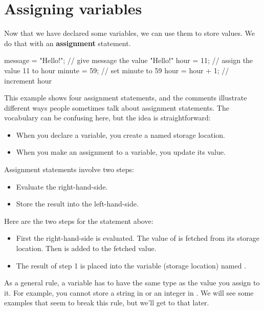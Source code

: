 \section{Assigning variables}


Now that we have declared some variables, we can use them to store values.
We do that with an {\bf assignment} statement.

\begin{code}
message = "Hello!";  // give message the value "Hello!"
hour = 11;           // assign the value 11 to hour
minute = 59;         // set minute to 59
hour = hour + 1;     // increment hour
\end{code}

This example shows four assignment statements, and the comments illustrate different ways people sometimes talk about assignment statements.
The vocabulary can be confusing here, but the idea is straightforward:

\begin{itemize}
\item When you declare a variable, you create a named storage location.
\item When you make an assignment to a variable, you update its value.
\end{itemize}

Assignment statements involve two steps:

\begin{itemize}
\item Evaluate the right-hand-side.
\item Store the result into the left-hand-side. 
\end{itemize}

Here are the two steps for the statement  above:
\begin{itemize}
\item First the right-hand-side  is evaluated.  The value of  is 
fetched from its storage location.  Then  is added to the fetched value.
\item The result of step 1 is placed into the variable (storage location) named .
\end{itemize}

As a general rule, a variable has to have the same type as the value you assign to it.
For example, you cannot store a string in  or an integer in .
We will see some examples that seem to break this rule, but we'll get to that later.

